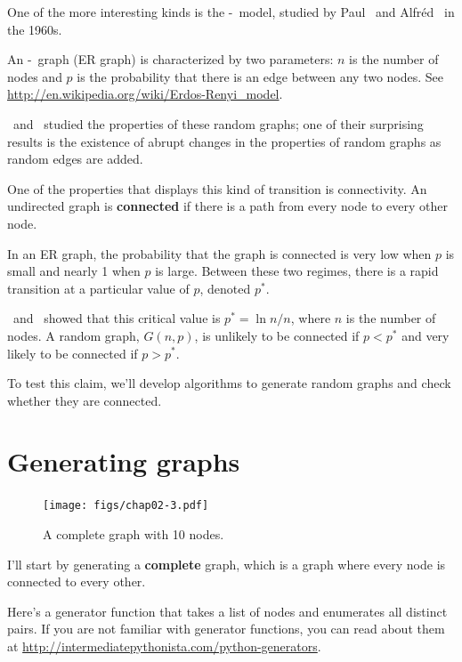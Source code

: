\documentclass[12pt]{book}
\theoremstyle{exercise}
\begin{document}
One of the more interesting kinds is the \Erdos-\Renyi~model, studied
by Paul \Erdos~and Alfr\'{e}d \Renyi~in the 1960s.

An \Erdos-\Renyi~graph (ER graph) is characterized by two parameters:
$n$ is the number of nodes and $p$ is the probability that there
is an edge between any two nodes.
See \url{http://en.wikipedia.org/wiki/Erdos-Renyi_model}.

\Erdos~and \Renyi~studied the properties of these random graphs;
one of their surprising results is the existence of
abrupt changes in the properties of random graphs as
random edges are added.

One of the properties that displays this kind of transition is
connectivity.  An undirected graph is {\bf connected} if there is a
path from every node to every other node.

In an ER graph, the probability that the graph is connected is very
low when $p$ is small and nearly 1 when $p$ is large.  Between these
two regimes, there is a rapid transition at a particular value of
$p$, denoted $p^*$.

\Erdos~and \Renyi~showed that this critical value is
$p^* = \ln n / n$, where $n$ is the number of nodes.
A random graph, $G(n, p)$, is unlikely to be connected
if $p < p^*$ and very likely to be connected if $p > p^*$.

To test this claim, we'll develop algorithms to generate random
graphs and check whether they are connected.


\section{Generating graphs}
\label{generating}

\begin{figure}
\centerline{\texttt{[image: figs/chap02-3.pdf]}}
\caption{A complete graph with 10 nodes.}
\label{chap02-3}
\end{figure}

I'll start by generating a {\bf complete} graph, which is a graph
where every node is connected to every other.

Here's a generator function that takes a list of nodes and enumerates
all distinct pairs.  If you are not familiar with generator functions,
you can read about them at \url{http://intermediatepythonista.com/python-generators}.
\end{document}
